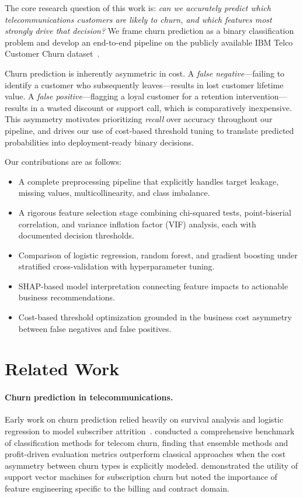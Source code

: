\documentclass{article}
\begin{document}
The core research question of this work is: \emph{can we accurately predict which
telecommunications customers are likely to churn, and which features most strongly drive
that decision?} We frame churn prediction as a binary classification problem and develop
an end-to-end pipeline on the publicly available IBM Telco Customer Churn
dataset~\citep{ibmTelco2019}.

Churn prediction is inherently asymmetric in cost. A \emph{false negative}---failing to
identify a customer who subsequently leaves---results in lost customer lifetime value.
A \emph{false positive}---flagging a loyal customer for a retention intervention---results
in a wasted discount or support call, which is comparatively inexpensive. This asymmetry
motivates prioritizing \emph{recall} over accuracy throughout our pipeline, and drives
our use of cost-based threshold tuning to translate predicted probabilities into
deployment-ready binary decisions.

Our contributions are as follows:
\begin{itemize}
  \item A complete preprocessing pipeline that explicitly handles target leakage, missing
        values, multicollinearity, and class imbalance.
  \item A rigorous feature selection stage combining chi-squared tests, point-biserial
        correlation, and variance inflation factor (VIF) analysis, each with documented
        decision thresholds.
  \item Comparison of logistic regression, random forest, and gradient boosting under
        stratified cross-validation with hyperparameter tuning.
  \item SHAP-based model interpretation connecting feature impacts to actionable business
        recommendations.
  \item Cost-based threshold optimization grounded in the business cost asymmetry between
        false negatives and false positives.
\end{itemize}


\section{Related Work}

\paragraph{Churn prediction in telecommunications.}
Early work on churn prediction relied heavily on survival analysis and logistic regression
to model subscriber attrition~\citep{vandenPoel2004}. \citet{verbeke2012} conducted a
comprehensive benchmark of classification methods for telecom churn, finding that
ensemble methods and profit-driven evaluation metrics outperform classical approaches when
the cost asymmetry between churn types is explicitly modeled. \citet{coussement2008}
demonstrated the utility of support vector machines for subscription churn but noted the
importance of feature engineering specific to the billing and contract domain.
\end{document}

